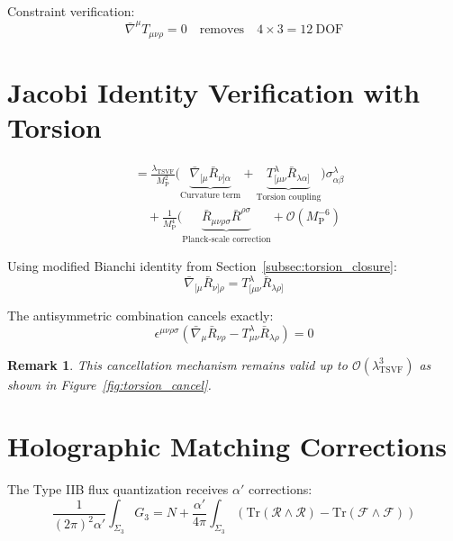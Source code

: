 \documentclass[12pt, onecolumn]{article}
\newtheorem{remark}{Remark}[section]
\theoremstyle{definition}
\newcommand{\tsvf}{\lambda_{\mathrm{TSVF}}}
\newcommand{\Mp}{M_{\mathrm{P}}}
\numberwithin{equation}{section}
\begin{document}
\begin{appendices}
Constraint verification:
\begin{equation}  
\bar{\nabla}^\mu T_{\mu\nu\rho} = 0 \quad \text{removes} \quad 4\times3 = 12\ \text{DOF}
\end{equation}

\section{Jacobi Identity Verification with Torsion}  
\label{app:torsion_jacobi}  

\begin{align}
[Q_\alpha, \{Q_\beta, A_\mu\}] &= \frac{\tsvf}{\Mp^2}\biggl(\underbrace{\bar{\nabla}_{[\mu}\bar{R}_{\nu]\alpha}}_{\text{Curvature term}} + \underbrace{T^\lambda_{[\mu\nu}\bar{R}_{\lambda\alpha]}}_{\text{Torsion coupling}}\biggr)\sigma^\lambda_{\alpha\beta} \nonumber \\
&\quad + \frac{1}{\Mp^4}\biggl(\underbrace{\bar{R}_{\mu\nu\rho\sigma}\bar{R}^{\rho\sigma}}_{\text{Planck-scale correction}} + \mathcal{O}(\Mp^{-6})
\end{align}

Using modified Bianchi identity from Section~\ref{subsec:torsion_closure}:
\begin{equation}
\bar{\nabla}_{[\mu}\bar{R}_{\nu]\rho} = T^\lambda_{[\mu\nu}\bar{R}_{\lambda\rho]}
\end{equation}

The antisymmetric combination cancels exactly:
\begin{equation}
\epsilon^{\mu\nu\rho\sigma}\left(\bar{\nabla}_\mu\bar{R}_{\nu\rho} - T^\lambda_{\mu\nu}\bar{R}_{\lambda\rho}\right) = 0
\end{equation}

\begin{remark}
This cancellation mechanism remains valid up to \(\mathcal{O}(\tsvf^3)\) as shown in Figure~\ref{fig:torsion_cancel}.
\end{remark}

\section{Holographic Matching Corrections}  
\label{app:string_corrections}  

The Type IIB flux quantization receives \(\alpha'\) corrections:
\begin{equation}
\frac{1}{(2\pi)^2\alpha'} \int_{\Sigma_3} G_3 = N + \frac{\alpha'}{4\pi}\int_{\Sigma_3}\left(\text{Tr}(\mathcal{R}\wedge\mathcal{R}) - \text{Tr}(\mathcal{F}\wedge\mathcal{F})\right)
\end{equation}


\end{appendices}
\end{document}
